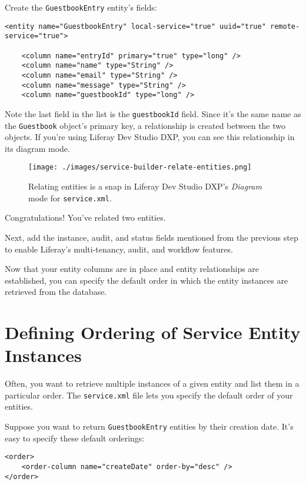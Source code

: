 Create the \texttt{GuestbookEntry} entity's fields:

\begin{verbatim}
<entity name="GuestbookEntry" local-service="true" uuid="true" remote-service="true">

    <column name="entryId" primary="true" type="long" />
    <column name="name" type="String" />
    <column name="email" type="String" />
    <column name="message" type="String" />
    <column name="guestbookId" type="long" />
\end{verbatim}

Note the last field in the list is the \texttt{guestbookId} field. Since
it's the same name as the \texttt{Guestbook} object's primary key, a
relationship is created between the two objects. If you're using Liferay
Dev Studio DXP, you can see this relationship in its diagram mode.

\begin{figure}
\centering
\texttt{[image: ./images/service-builder-relate-entities.png]}
\caption{Relating entities is a snap in Liferay Dev Studio DXP's
\emph{Diagram} mode for \texttt{service.xml}.}
\end{figure}

Congratulations! You've related two entities.

Next, add the instance, audit, and status fields mentioned from the
previous step to enable Liferay's multi-tenancy, audit, and workflow
features.

Now that your entity columns are in place and entity relationships are
established, you can specify the default order in which the entity
instances are retrieved from the database.

\chapter{Defining Ordering of Service Entity
Instances}\label{defining-ordering-of-service-entity-instances}

Often, you want to retrieve multiple instances of a given entity and
list them in a particular order. The \texttt{service.xml} file lets you
specify the default order of your entities.

Suppose you want to return \texttt{GuestbookEntry} entities by their
creation date. It's easy to specify these default orderings:

\begin{verbatim}
<order>
    <order-column name="createDate" order-by="desc" />
</order>
\end{verbatim}


